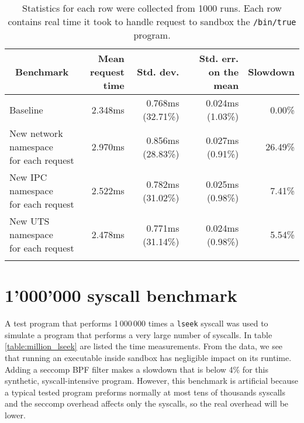 \documentclass[en]{pracamgr}
\begin{document}
\begin{small}
\begin{longtable}{|l|r|r|r|r|}
\hline
\multicolumn{1}{|c|}{Benchmark} & \makecell{Mean\\request time} & Std. dev. & Std. err. on the mean & \multicolumn{1}{c|}{Slowdown} \\
\hline
Baseline                                              & 2.348ms & 0.768ms (32.71\%) & 0.024ms (1.03\%) & 0.00\% \\
\hline
\makecell{New network namespace \\ for each request}  & 2.970ms & 0.856ms (28.83\%) & 0.027ms (0.91\%) & 26.49\% \\
\hline
\makecell{New IPC namespace \\ for each request}      & 2.522ms & 0.782ms (31.02\%) & 0.025ms (0.98\%) & 7.41\% \\
\hline
\makecell{New UTS namespace \\ for each request}      & 2.478ms & 0.771ms (31.14\%) & 0.024ms (0.98\%) & 5.54\% \\
\hline
\caption{Statistics for each row were collected from 1000 runs. Each row contains real time it took to handle request to sandbox the \texttt{/bin/true} program.}
\label{table:optimization_impact}
\end{longtable}
\end{small}

\iffalse
\section{1'000'000 syscall benchmark}

A test program that performs 1\,000\,000 times a \texttt{lseek} syscall was used to simulate a program that performs a very large number of syscalls. In table \ref{table:million_lseek} are listed the time measurements. From the data, we see that running an executable inside sandbox has negligible impact on its runtime. Adding a seccomp BPF filter makes a slowdown that is below 4\% for this synthetic, syscall-intensive program. However, this benchmark is artificial because a typical tested program preforms normally at most tens of thousands syscalls and the seccomp overhead affects only the syscalls, so the real overhead will be lower.
\end{document}
